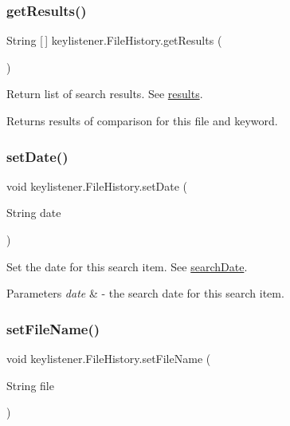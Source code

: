 \subsubsection{\texorpdfstring{get\+Results()}{getResults()}}
{\footnotesize\ttfamily String \mbox{[}$\,$\mbox{]} keylistener.\+File\+History.\+get\+Results (\begin{DoxyParamCaption}{ }\end{DoxyParamCaption})\hspace{0.3cm}{\ttfamily [inline]}}

Return list of search results. See \hyperlink{classkeylistener_1_1_file_history_a665862b474b78805e841aaf23ab1123c}{results}. \begin{DoxyReturn}{Returns}
results of comparison for this file and keyword. 
\end{DoxyReturn}
\mbox{\label{classkeylistener_1_1_file_history_a1de701cd56aac77075457d16c411be74}} 
\subsubsection{\texorpdfstring{set\+Date()}{setDate()}}
{\footnotesize\ttfamily void keylistener.\+File\+History.\+set\+Date (\begin{DoxyParamCaption}\item[{String}]{date }\end{DoxyParamCaption})\hspace{0.3cm}{\ttfamily [inline]}}

Set the date for this search item. See \hyperlink{classkeylistener_1_1_file_history_aa05796c787baef3237827630d3284496}{search\+Date}. 
\begin{DoxyParams}{Parameters}
{\em date} & -\/ the search date for this search item. \\
\hline
\end{DoxyParams}
\mbox{\label{classkeylistener_1_1_file_history_a721185583f76cb336eb489e0124a8be8}} 
\subsubsection{\texorpdfstring{set\+File\+Name()}{setFileName()}}
{\footnotesize\ttfamily void keylistener.\+File\+History.\+set\+File\+Name (\begin{DoxyParamCaption}\item[{String}]{file }\end{DoxyParamCaption})\hspace{0.3cm}{\ttfamily [inline]}}

